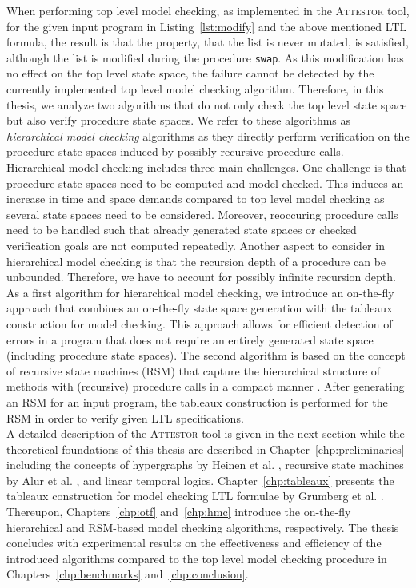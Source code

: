 \documentclass[a4paper, 12pt, twoside]{report}
\begin{document}
	When performing top level model checking, as implemented in the \textsc{Attestor} tool, for the given input program in Listing~\ref{lst:modify} and the above mentioned LTL formula, the result is that the property, that the list is never mutated, is satisfied, although the list is modified during the procedure \texttt{swap}. As this modification has no effect on the top level state space, the failure cannot be detected by the currently implemented top level model checking algorithm. Therefore, in this thesis, we analyze two algorithms that do not only check the top level state space but also verify procedure state spaces. We refer to these algorithms as \textit{hierarchical model checking} algorithms as they directly perform verification on the procedure state spaces induced by possibly recursive procedure calls. \\
	
	Hierarchical model checking includes three main challenges. One challenge is that procedure state spaces need to be computed and model checked. This induces an increase in time and space demands compared to top level model checking as several state spaces need to be considered. Moreover, reoccuring procedure calls need to be handled such that already generated state spaces or checked verification goals are not computed repeatedly. Another aspect to consider in hierarchical model checking is that the recursion depth of a procedure can be unbounded. Therefore, we have to account for possibly infinite recursion depth.\\
	
	As a first algorithm for hierarchical model checking, we introduce an on-the-fly approach that combines an on-the-fly state space generation with the tableaux construction for model checking. This approach allows for efficient detection of errors in a program that does not require an entirely generated state space (including procedure state spaces). The second algorithm is based on the concept of recursive state machines (RSM) that capture the hierarchical structure of methods with (recursive) procedure calls in a compact manner \cite{alur2001analysis}. After generating an RSM for an input program, the tableaux construction is performed for the RSM in order to verify given LTL specifications.\\	
	
	A detailed description of the \textsc{Attestor} tool is given in the next section while the theoretical foundations of this thesis are described in Chapter~\ref{chp:preliminaries} including the concepts of hypergraphs by Heinen et al. \cite{heinen2015juggrnaut}, recursive state machines by Alur et al. \cite{alur2001analysis}, and linear temporal logics. Chapter~\ref{chp:tableaux} presents the tableaux construction for model checking LTL formulae by Grumberg et al. \cite{bhat1995efficient}. Thereupon, Chapters~\ref{chp:otf} and~\ref{chp:hmc} introduce the on-the-fly hierarchical and RSM-based model checking algorithms, respectively. The thesis concludes with experimental results on the effectiveness and efficiency of the introduced algorithms compared to the top level model checking procedure in Chapters~\ref{chp:benchmarks} and~\ref{chp:conclusion}. 
	
\end{document}
